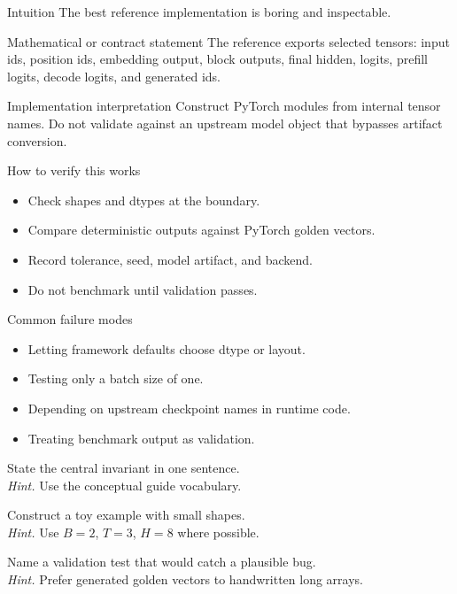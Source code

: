 \begin{intuitionbox}{Intuition}
The best reference implementation is boring and inspectable.
\end{intuitionbox}

\begin{definitionbox}{Mathematical or contract statement}
The reference exports selected tensors: input ids, position ids, embedding output, block outputs, final hidden, logits, prefill logits, decode logits, and generated ids.
\end{definitionbox}

\begin{implementationbox}{Implementation interpretation}
Construct PyTorch modules from internal tensor names. Do not validate against an upstream model object that bypasses artifact conversion.
\end{implementationbox}

\begin{verificationbox}{How to verify this works}
\begin{itemize}
\item Check shapes and dtypes at the boundary.
\item Compare deterministic outputs against PyTorch golden vectors.
\item Record tolerance, seed, model artifact, and backend.
\item Do not benchmark until validation passes.
\end{itemize}
\end{verificationbox}

\begin{warningbox}{Common failure modes}
\begin{itemize}
\item Letting framework defaults choose dtype or layout.
\item Testing only a batch size of one.
\item Depending on upstream checkpoint names in runtime code.
\item Treating benchmark output as validation.
\end{itemize}
\end{warningbox}

\begin{chapterexercises}
\item State the central invariant in one sentence.\\
\textit{Hint.} Use the conceptual guide vocabulary.
\item Construct a toy example with small shapes.\\
\textit{Hint.} Use $B=2$, $T=3$, $H=8$ where possible.
\item Name a validation test that would catch a plausible bug.\\
\textit{Hint.} Prefer generated golden vectors to handwritten long arrays.
\end{chapterexercises}

